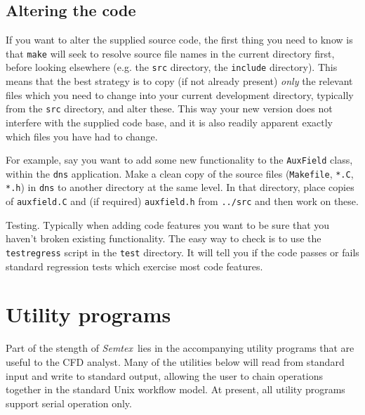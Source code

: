 \documentclass[11pt]{report}
\newcommand{\Semtex}{\emph{Semtex}} \newcommand{\Dog}{\emph{Dog}}
\begin{document}
\section{Altering the code}
\label{sec.alt}

If you want to alter the supplied source code, the first thing you
need to know is that \texttt{make} will seek to resolve source file
names in the current directory first, before looking elsewhere
(e.g. the \texttt{src} directory, the \texttt{include} directory).
This means that the best strategy is to copy (if not already present)
\emph{only} the relevant files which you need to change into your
current development directory, typically from the \texttt{src}
directory, and alter these. This way your new version does not
interfere with the supplied code base, and it is also readily apparent
exactly which files you have had to change.

For example, say you want to add some new functionality to the
\texttt{AuxField} class, within the \texttt{dns} application. Make a
clean copy of the source files (\texttt{Makefile}, \texttt{*.C},
\texttt{*.h}) in \texttt{dns} to another directory at the same
level. In that directory, place copies of \texttt{auxfield.C} and (if
required) \texttt{auxfield.h} from \texttt{../src} and then work on
these.

Testing.  Typically when adding code features you want to be sure that
you haven't broken existing functionality.  The easy way to check is
to use the \verb|testregress| script in the \verb|test| directory. It
will tell you if the code passes or fails standard regression tests
which exercise most code features.


\chapter{Utility programs}
\label{ch.utilities}

Part of the stength of \Semtex\ lies in the accompanying utility
programs that are useful to the CFD analyst.  Many of the utilities
below will read from standard input and write to standard output,
allowing the user to chain operations together in the standard Unix
workflow model. At present, all utility programs support serial
operation only.

\end{document}
